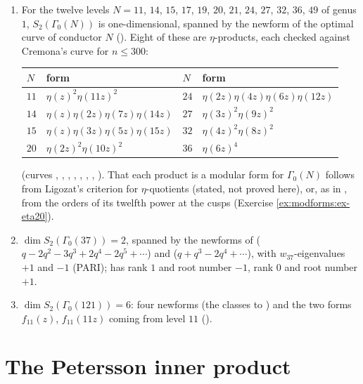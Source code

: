 \begin{example}\label{ex:modforms:small-levels}
\begin{enumerate}[label=(\alph*)]
\item For the twelve levels $N=11$, $14$, $15$, $17$, $19$, $20$, $21$, $24$, $27$, $32$, $36$, $49$ of genus $1$, $S_2(\Gamma_0(N))$ is one-dimensional, spanned by the newform of the optimal curve of conductor $N$ (). Eight of these are $\eta$-products, each checked against Cremona's curve for $n\le300$:
\begin{center}
\begin{tabular}{@{}llll@{}}
\toprule
$N$ & form & $N$ & form\\
\midrule
$11$ & $\eta(z)^2\eta(11z)^2$ & $24$ & $\eta(2z)\eta(4z)\eta(6z)\eta(12z)$\\
$14$ & $\eta(z)\eta(2z)\eta(7z)\eta(14z)$ & $27$ & $\eta(3z)^2\eta(9z)^2$\\
$15$ & $\eta(z)\eta(3z)\eta(5z)\eta(15z)$ & $32$ & $\eta(4z)^2\eta(8z)^2$\\
$20$ & $\eta(2z)^2\eta(10z)^2$ & $36$ & $\eta(6z)^4$\\
\bottomrule
\end{tabular}
\end{center}
(curves , , , , , , , ). That each product is a modular form for $\Gamma_0(N)$ follows from
Ligozat's criterion for $\eta$-quotients \cite{Ligozat75} (stated, not proved here), or, as in , from the orders of its twelfth power at the cusps
(Exercise \ref{ex:modforms:ex-eta20}).
\item $\dim S_2(\Gamma_0(37))=2$, spanned by the newforms of  ($q-2q^2-3q^3+2q^4-2q^5+\cdots$) and  ($q+q^3-2q^4+\cdots$), with $w_{37}$-eigenvalues $+1$
and $-1$ (PARI);  has rank $1$ and root number $-1$,  rank $0$ and root number $+1$.
\item $\dim S_2(\Gamma_0(121))=6$: four newforms (the classes  to ) and the two forms $f_{11}(z)$, $f_{11}(11z)$ coming from level $11$ ().
\end{enumerate}
\end{example}

\section{The Petersson inner product}\label{sec:modforms:petersson}

